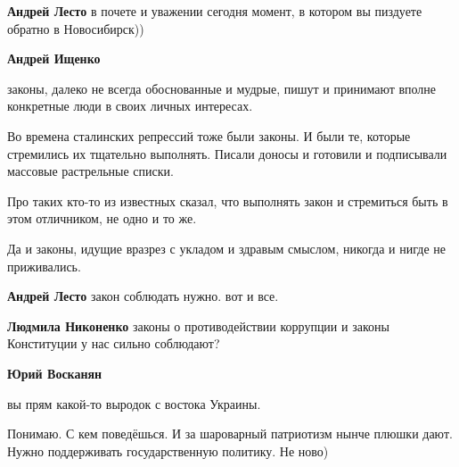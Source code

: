 \begin{itemize}
\begin{itemize}
\textbf{Андрей Лесто} в почете и уважении сегодня момент, в котором вы пиздуете обратно в Новосибирск))

 
\textbf{Андрей Ищенко} 

законы, далеко не всегда обоснованные и мудрые, пишут и принимают вполне
конкретные люди в своих личных интересах.

Во времена сталинских репрессий тоже были законы. И были те, которые стремились
их тщательно выполнять. Писали доносы и готовили и подписывали массовые
растрельные списки.

Про таких кто-то из известных сказал, что выполнять закон и стремиться быть в
этом отличником, не одно и то же.

Да и законы, идущие вразрез с укладом и здравым смыслом, никогда и нигде не
приживались.

 
\textbf{Андрей Лесто} закон соблюдать нужно. вот и все.

 
\textbf{Людмила Никоненко} законы о противодействии коррупции и законы Конституции у нас сильно соблюдают?

 
\textbf{Юрий Восканян} 

вы прям какой-то выродок с востока Украины.

Понимаю. С кем поведёшься. И за шароварный патриотизм нынче плюшки дают. Нужно
поддерживать государственную политику. Не ново)



\end{itemize}
\end{itemize}

